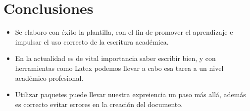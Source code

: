 \documentclass[journal, spanish]{IEEEtran}
\begin{document}
\section{Conclusiones}
\begin{itemize}
    \item Se elaboro con éxito la plantilla, con el fin de promover el aprendizaje e impulsar el uso correcto de la escritura académica.
    \item En la actualidad  es de vital importancia saber escribir bien, y con herramientas como Latex podemos llevar a cabo esa tarea a un nivel académico profesional.
    \item Utilizar paquetes puede llevar nuestra expreiencia un paso más allá, además es correcto evitar errores en la creación del documento.
\end{itemize}
\printbibliography[title={\section{Referencias}}]
\clearpage

\end{document}
